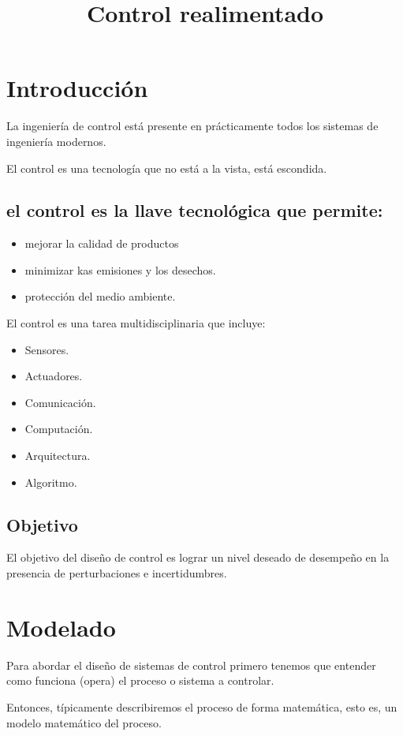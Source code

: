 \documentclass[a4paper]{article}
\begin{document}
\title{Control realimentado}
\maketitle
\section{Introducción}\label{sec:intro}
La ingeniería de control está presente en prácticamente todos los sistemas de ingeniería modernos.

El control es una tecnología que no está a la vista, está escondida.

\subsection{el control es la llave tecnológica que permite:}
\begin{itemize}
\item mejorar la calidad de productos
\item minimizar kas emisiones y los desechos.
\item protección del medio ambiente.
\end{itemize}

El control es una tarea multidisciplinaria que incluye:
\begin{itemize}
\item Sensores.
\item Actuadores.
\item Comunicación.
\item Computación.
\item Arquitectura.
\item Algoritmo.
\end{itemize}

\subsection{Objetivo}
El objetivo del diseño de control es lograr un nivel deseado de desempeño en la presencia de perturbaciones e incertidumbres.

\section{Modelado}\label{sec:modelado}
Para abordar el diseño de sistemas de control primero tenemos que entender como funciona (opera) el proceso o sistema a controlar.

Entonces, típicamente describiremos el proceso de forma matemática, esto es, un modelo matemático del proceso.
\end{document}
